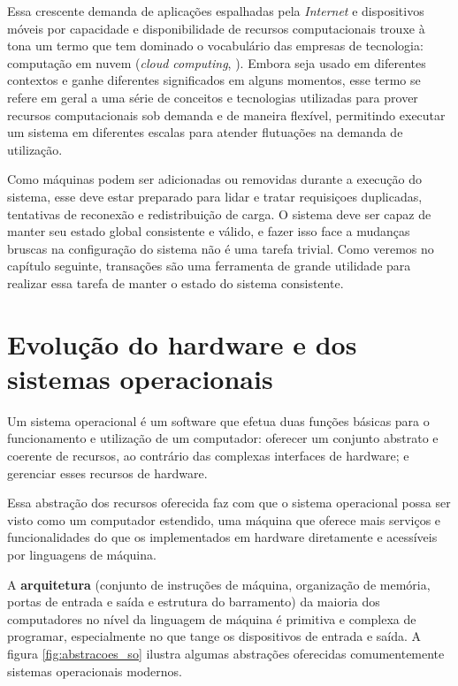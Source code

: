\documentclass[11pt,twoside,a4paper]{book}
\begin{document}
Essa crescente demanda de aplicações espalhadas pela \emph{Internet} e dispositivos móveis por capacidade e disponibilidade de recursos computacionais trouxe à tona um termo que tem dominado o vocabulário das empresas de tecnologia: computação em nuvem (\emph{cloud computing}, \cite{cloud}). Embora seja usado em diferentes contextos e ganhe diferentes significados em alguns momentos, esse termo se refere em geral a uma série de conceitos e tecnologias utilizadas para prover recursos computacionais sob demanda e de maneira flexível, permitindo executar um sistema em diferentes escalas para atender flutuações na demanda de utilização. 

Como máquinas podem ser adicionadas ou removidas durante a execução do sistema, esse deve estar preparado para lidar e tratar requisiçoes duplicadas, tentativas de reconexão e redistribuição de carga. O sistema deve ser capaz de manter seu estado global consistente e válido, e fazer isso face a mudanças bruscas na configuração do sistema não é uma tarefa trivial. Como veremos no capítulo seguinte, transações são uma ferramenta de grande utilidade para realizar essa tarefa de manter o estado do sistema consistente. 

\section{Evolução do hardware e dos sistemas operacionais}
\label{sec:evolucao_sistemas_operacionais}
Um sistema operacional é um software que efetua duas funções básicas para o funcionamento e utilização de um computador: oferecer um conjunto abstrato e coerente de recursos, ao contrário das complexas interfaces de hardware; e gerenciar esses recursos de hardware. 

Essa abstração dos recursos oferecida faz com que o sistema operacional possa ser visto como um computador estendido, uma máquina que oferece mais serviços e funcionalidades do que os implementados em hardware diretamente e acessíveis por linguagens de máquina.

A \textbf{arquitetura} (conjunto de instruções de máquina, organização de memória, portas de entrada e saída e estrutura do barramento) da maioria dos computadores no nível da linguagem de máquina é primitiva e complexa de programar, especialmente no que tange os dispositivos de entrada e saída. A figura \ref{fig:abstracoes_so} ilustra algumas abstrações oferecidas comumentemente sistemas operacionais modernos.
\end{document}
